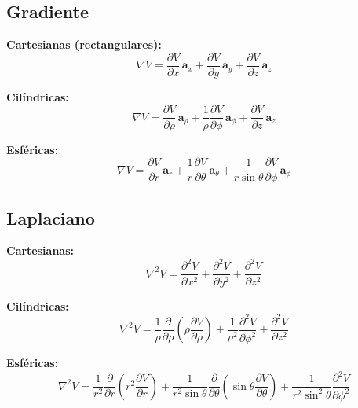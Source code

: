 \documentclass[11pt]{article}
\begin{document}
\subsection{Gradiente}

\textbf{Cartesianas (rectangulares):}
\begin{equation}
    \nabla V = \frac{\partial V}{\partial x} \, \mathbf{a}_x + \frac{\partial V}{\partial y} \, \mathbf{a}_y + \frac{\partial V}{\partial z} \, \mathbf{a}_z
\end{equation}

\textbf{Cilíndricas:}
\begin{equation}
    \nabla V = \frac{\partial V}{\partial \rho} \, \mathbf{a}_\rho + \frac{1}{\rho} \frac{\partial V}{\partial \phi} \, \mathbf{a}_\phi + \frac{\partial V}{\partial z} \, \mathbf{a}_z
\end{equation}

\textbf{Esféricas:}
\begin{equation}
    \nabla V = \frac{\partial V}{\partial r} \, \mathbf{a}_r + \frac{1}{r} \frac{\partial V}{\partial \theta} \, \mathbf{a}_\theta + \frac{1}{r \sin \theta} \frac{\partial V}{\partial \phi} \, \mathbf{a}_\phi
\end{equation}


\subsection{Laplaciano}

\textbf{Cartesianas:}
\begin{equation}
    \nabla^2 V = \frac{\partial^2 V}{\partial x^2} + \frac{\partial^2 V}{\partial y^2} + \frac{\partial^2 V}{\partial z^2}
\end{equation}

\textbf{Cilíndricas:}
\begin{equation}
    \nabla^2 V = \frac{1}{\rho} \frac{\partial}{\partial \rho} \left( \rho \frac{\partial V}{\partial \rho} \right) + \frac{1}{\rho^2} \frac{\partial^2 V}{\partial \phi^2} + \frac{\partial^2 V}{\partial z^2}
\end{equation}

\textbf{Esféricas:}
\begin{equation}
    \nabla^2 V = \frac{1}{r^2} \frac{\partial}{\partial r} \left( r^2 \frac{\partial V}{\partial r} \right) + \frac{1}{r^2 \sin \theta} \frac{\partial}{\partial \theta} \left( \sin \theta \frac{\partial V}{\partial \theta} \right) + \frac{1}{r^2 \sin^2 \theta} \frac{\partial^2 V}{\partial \phi^2}
\end{equation}
\end{document}
